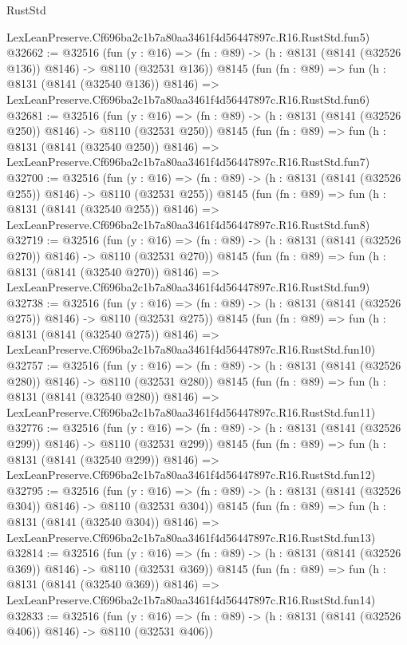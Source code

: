 \begin{lexlean}{RustStd}
\begin{coremodule}
    LexLeanPreserve.Cf696ba2c1b7a80aa3461f4d56447897c.R16.RustStd.fun5)
@32662 := @32516
    (fun (y : @16) => (fn : @89) -> (h : @8131 (@8141 (@32526 @136)) @8146) -> @8110 (@32531 @136))
    @8145
    (fun (fn : @89) =>
    fun (h : @8131 (@8141 (@32540 @136)) @8146) =>
    LexLeanPreserve.Cf696ba2c1b7a80aa3461f4d56447897c.R16.RustStd.fun6)
@32681 := @32516
    (fun (y : @16) => (fn : @89) -> (h : @8131 (@8141 (@32526 @250)) @8146) -> @8110 (@32531 @250))
    @8145
    (fun (fn : @89) =>
    fun (h : @8131 (@8141 (@32540 @250)) @8146) =>
    LexLeanPreserve.Cf696ba2c1b7a80aa3461f4d56447897c.R16.RustStd.fun7)
@32700 := @32516
    (fun (y : @16) => (fn : @89) -> (h : @8131 (@8141 (@32526 @255)) @8146) -> @8110 (@32531 @255))
    @8145
    (fun (fn : @89) =>
    fun (h : @8131 (@8141 (@32540 @255)) @8146) =>
    LexLeanPreserve.Cf696ba2c1b7a80aa3461f4d56447897c.R16.RustStd.fun8)
@32719 := @32516
    (fun (y : @16) => (fn : @89) -> (h : @8131 (@8141 (@32526 @270)) @8146) -> @8110 (@32531 @270))
    @8145
    (fun (fn : @89) =>
    fun (h : @8131 (@8141 (@32540 @270)) @8146) =>
    LexLeanPreserve.Cf696ba2c1b7a80aa3461f4d56447897c.R16.RustStd.fun9)
@32738 := @32516
    (fun (y : @16) => (fn : @89) -> (h : @8131 (@8141 (@32526 @275)) @8146) -> @8110 (@32531 @275))
    @8145
    (fun (fn : @89) =>
    fun (h : @8131 (@8141 (@32540 @275)) @8146) =>
    LexLeanPreserve.Cf696ba2c1b7a80aa3461f4d56447897c.R16.RustStd.fun10)
@32757 := @32516
    (fun (y : @16) => (fn : @89) -> (h : @8131 (@8141 (@32526 @280)) @8146) -> @8110 (@32531 @280))
    @8145
    (fun (fn : @89) =>
    fun (h : @8131 (@8141 (@32540 @280)) @8146) =>
    LexLeanPreserve.Cf696ba2c1b7a80aa3461f4d56447897c.R16.RustStd.fun11)
@32776 := @32516
    (fun (y : @16) => (fn : @89) -> (h : @8131 (@8141 (@32526 @299)) @8146) -> @8110 (@32531 @299))
    @8145
    (fun (fn : @89) =>
    fun (h : @8131 (@8141 (@32540 @299)) @8146) =>
    LexLeanPreserve.Cf696ba2c1b7a80aa3461f4d56447897c.R16.RustStd.fun12)
@32795 := @32516
    (fun (y : @16) => (fn : @89) -> (h : @8131 (@8141 (@32526 @304)) @8146) -> @8110 (@32531 @304))
    @8145
    (fun (fn : @89) =>
    fun (h : @8131 (@8141 (@32540 @304)) @8146) =>
    LexLeanPreserve.Cf696ba2c1b7a80aa3461f4d56447897c.R16.RustStd.fun13)
@32814 := @32516
    (fun (y : @16) => (fn : @89) -> (h : @8131 (@8141 (@32526 @369)) @8146) -> @8110 (@32531 @369))
    @8145
    (fun (fn : @89) =>
    fun (h : @8131 (@8141 (@32540 @369)) @8146) =>
    LexLeanPreserve.Cf696ba2c1b7a80aa3461f4d56447897c.R16.RustStd.fun14)
@32833 := @32516
    (fun (y : @16) => (fn : @89) -> (h : @8131 (@8141 (@32526 @406)) @8146) -> @8110 (@32531 @406))

\end{coremodule}
\end{lexlean}
